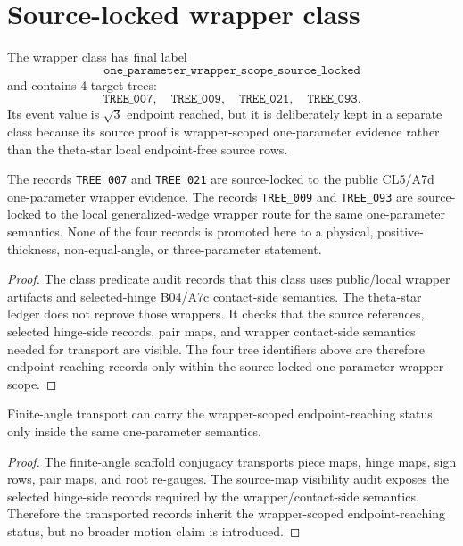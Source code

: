 
\section{Source-locked wrapper class}

The wrapper class has final label
\[
  \texttt{one\_parameter\_wrapper\_scope\_source\_locked}
\]
and contains 4 target trees:
\[
  \texttt{TREE\_007},\quad \texttt{TREE\_009},\quad
  \texttt{TREE\_021},\quad \texttt{TREE\_093}.
\]
Its event value is \(\sqrt{3}\) endpoint reached, but it is deliberately kept in a separate class because its source proof is wrapper-scoped one-parameter evidence rather than the theta-star local endpoint-free source rows.

\begin{lemma}
The records \texttt{TREE\_007} and \texttt{TREE\_021} are source-locked to the public CL5/A7d one-parameter wrapper evidence.  The records \texttt{TREE\_009} and \texttt{TREE\_093} are source-locked to the local generalized-wedge wrapper route for the same one-parameter semantics.  None of the four records is promoted here to a physical, positive-thickness, non-equal-angle, or three-parameter statement.
\end{lemma}

\begin{proof}
The class predicate audit records that this class uses public/local wrapper artifacts and selected-hinge B04/A7c contact-side semantics.  The theta-star ledger does not reprove those wrappers.  It checks that the source references, selected hinge-side records, pair maps, and wrapper contact-side semantics needed for transport are visible.  The four tree identifiers above are therefore endpoint-reaching records only within the source-locked one-parameter wrapper scope.
\end{proof}

\begin{lemma}
Finite-angle transport can carry the wrapper-scoped endpoint-reaching status only inside the same one-parameter semantics.
\end{lemma}

\begin{proof}
The finite-angle scaffold conjugacy transports piece maps, hinge maps, sign rows, pair maps, and root re-gauges.  The source-map visibility audit exposes the selected hinge-side records required by the wrapper/contact-side semantics.  Therefore the transported records inherit the wrapper-scoped endpoint-reaching status, but no broader motion claim is introduced.
\end{proof}

